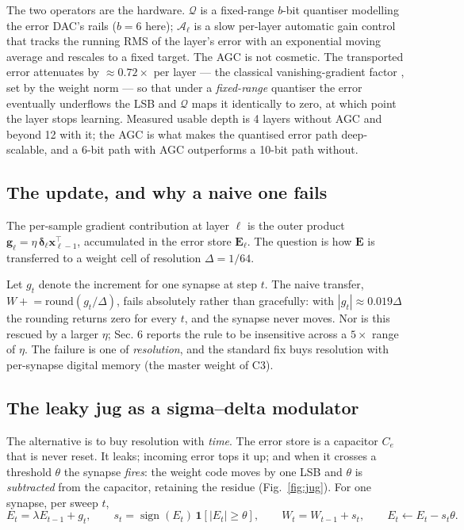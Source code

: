 \documentclass[11pt]{article}
\begin{document}
The two operators are the hardware. \(\mathcal{Q}\) is a fixed-range
\(b\)-bit quantiser modelling the error DAC's rails (\(b = 6\) here);
\(\mathcal{A}_\ell\) is a slow per-layer automatic gain control that
tracks the running RMS of the layer's error with an exponential moving
average and rescales to a fixed target. The AGC is not cosmetic. The
transported error attenuates by \(\approx 0.72\times\) per layer --- the
classical vanishing-gradient factor \cite{bengio1994learning}, set by
the weight norm --- so that under a \emph{fixed-range} quantiser the
error eventually underflows the LSB and \(\mathcal{Q}\) maps it
identically to zero, at which point the layer stops learning. Measured
usable depth is 4 layers without AGC and beyond 12 with it; the AGC is
what makes the quantised error path deep-scalable, and a 6-bit path with
AGC outperforms a 10-bit path without.

\hypertarget{the-update-and-why-a-naive-one-fails}{%
\subsection{The update, and why a naive one
fails}\label{the-update-and-why-a-naive-one-fails}}

The per-sample gradient contribution at layer \(\ell\) is the outer
product \(\bm g_\ell = \eta\, \bm\delta_\ell \bm x_{\ell-1}^{\!\top}\),
accumulated in the error store \(\bm E_\ell\). The question is how
\(\bm E\) is transferred to a weight cell of resolution
\(\Delta = 1/64\).

Let \(g_t\) denote the increment for one synapse at step \(t\). The
naive transfer, \(W \mathrel{+}= \mathrm{round}(g_t/\Delta)\), fails
absolutely rather than gracefully: with \(|g_t| \approx 0.019\Delta\)
the rounding returns zero for every \(t\), and the synapse never moves.
Nor is this rescued by a larger \(\eta\); Sec. 6 reports the rule to be
insensitive across a \(5\times\) range of \(\eta\). The failure is one
of \emph{resolution}, and the standard fix buys resolution with
per-synapse digital memory (the master weight of C3).

\hypertarget{sec:jug}{%
\subsection{The leaky jug as a sigma--delta modulator}\label{sec:jug}}

The alternative is to buy resolution with \emph{time}. The error store
is a capacitor \(C_e\) that is never reset. It leaks; incoming error
tops it up; and when it crosses a threshold \(\theta\) the synapse
\emph{fires}: the weight code moves by one LSB and \(\theta\) is
\emph{subtracted} from the capacitor, retaining the residue (Fig.~\ref{fig:jug}).
For one synapse, per sweep \(t\), \begin{equation}
E_t = \lambda E_{t-1} + g_t, \qquad
s_t = \operatorname{sign}(E_t)\,\mathbf{1}\!\left[|E_t| \ge \theta\right], \qquad
W_t = W_{t-1} + s_t, \qquad
E_t \leftarrow E_t - s_t\theta .
\label{eq:jug}
\end{equation}
\end{document}
